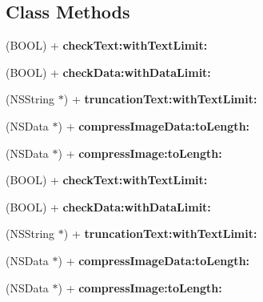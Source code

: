 \subsection*{Class Methods}
\begin{DoxyCompactItemize}
\item 
\mbox{\label{interface_u_m_social_handler_config_ad6befc0c4eaeb85f4443bbc70db96dde}} 
(B\+O\+OL) + {\bfseries check\+Text\+:with\+Text\+Limit\+:}
\item 
\mbox{\label{interface_u_m_social_handler_config_a787e906844254e0e1835e8e3d89dd2fb}} 
(B\+O\+OL) + {\bfseries check\+Data\+:with\+Data\+Limit\+:}
\item 
\mbox{\label{interface_u_m_social_handler_config_ac8e94bdb61a20edc13c0e0b3583627cb}} 
(N\+S\+String $\ast$) + {\bfseries truncation\+Text\+:with\+Text\+Limit\+:}
\item 
\mbox{\label{interface_u_m_social_handler_config_af35cc7035995136921ffd3a236d8037d}} 
(N\+S\+Data $\ast$) + {\bfseries compress\+Image\+Data\+:to\+Length\+:}
\item 
\mbox{\label{interface_u_m_social_handler_config_a2a947b1e0e0712310bf98f845c69af0b}} 
(N\+S\+Data $\ast$) + {\bfseries compress\+Image\+:to\+Length\+:}
\item 
\mbox{\label{interface_u_m_social_handler_config_ad6befc0c4eaeb85f4443bbc70db96dde}} 
(B\+O\+OL) + {\bfseries check\+Text\+:with\+Text\+Limit\+:}
\item 
\mbox{\label{interface_u_m_social_handler_config_a787e906844254e0e1835e8e3d89dd2fb}} 
(B\+O\+OL) + {\bfseries check\+Data\+:with\+Data\+Limit\+:}
\item 
\mbox{\label{interface_u_m_social_handler_config_ac8e94bdb61a20edc13c0e0b3583627cb}} 
(N\+S\+String $\ast$) + {\bfseries truncation\+Text\+:with\+Text\+Limit\+:}
\item 
\mbox{\label{interface_u_m_social_handler_config_af35cc7035995136921ffd3a236d8037d}} 
(N\+S\+Data $\ast$) + {\bfseries compress\+Image\+Data\+:to\+Length\+:}
\item 
\mbox{\label{interface_u_m_social_handler_config_a2a947b1e0e0712310bf98f845c69af0b}} 
(N\+S\+Data $\ast$) + {\bfseries compress\+Image\+:to\+Length\+:}
\end{DoxyCompactItemize}
